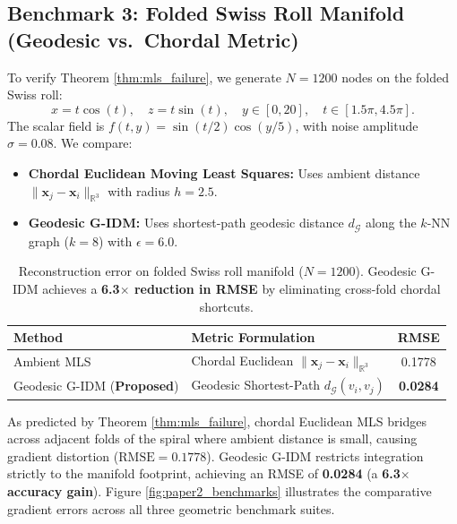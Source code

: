 \documentclass[11pt,a4paper]{article}
\theoremstyle{definition}
\begin{document}
\subsection{Benchmark 3: Folded Swiss Roll Manifold (Geodesic vs.\ Chordal Metric)}
To verify Theorem \ref{thm:mls_failure}, we generate $N = 1200$ nodes on the folded Swiss roll:
\begin{equation}
x = t \cos(t), \quad z = t \sin(t), \quad y \in [0, 20], \quad t \in [1.5\pi, 4.5\pi].
\end{equation}
The scalar field is $f(t, y) = \sin(t/2) \cos(y/5)$, with noise amplitude $\sigma = 0.08$. 
We compare:
\begin{itemize}
    \item \textbf{Chordal Euclidean Moving Least Squares:} Uses ambient distance $\|\mathbf{x}_j - \mathbf{x}_i\|_{\mathbb{R}^3}$ with radius $h = 2.5$.
    \item \textbf{Geodesic G-IDM:} Uses shortest-path geodesic distance $d_{\mathcal{G}}$ along the $k$-NN graph ($k = 8$) with $\epsilon = 6.0$.
\end{itemize}

\begin{table}[htbp]
\centering
\small
\caption{Reconstruction error on folded Swiss roll manifold ($N = 1200$). Geodesic G-IDM achieves a \textbf{6.3$\times$ reduction in RMSE} by eliminating cross-fold chordal shortcuts.}
\label{tab:swiss_results}
\begin{tabular}{llc}
\toprule
\textbf{Method} & \textbf{Metric Formulation} & \textbf{RMSE} \\
\midrule
Ambient MLS & Chordal Euclidean $\|\mathbf{x}_j - \mathbf{x}_i\|_{\mathbb{R}^3}$ & 0.1778 \\
Geodesic G-IDM (\textbf{Proposed}) & Geodesic Shortest-Path $d_{\mathcal{G}}(v_i, v_j)$ & \textbf{0.0284} \\
\bottomrule
\end{tabular}
\end{table}

As predicted by Theorem \ref{thm:mls_failure}, chordal Euclidean MLS bridges across adjacent folds of the spiral where ambient distance is small, causing gradient distortion ($\text{RMSE} = 0.1778$). Geodesic G-IDM restricts integration strictly to the manifold footprint, achieving an RMSE of \textbf{0.0284} (a \textbf{6.3$\times$ accuracy gain}). Figure \ref{fig:paper2_benchmarks} illustrates the comparative gradient errors across all three geometric benchmark suites.
\end{document}
